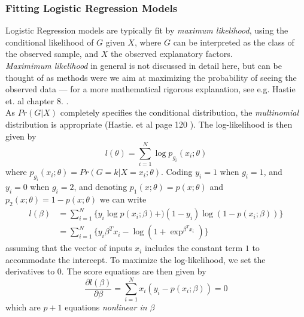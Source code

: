 \documentclass[10pt, a4paper, twocolumn]{article}
\newcommand{\myparagraph}[1]{\paragraph{#1}\mbox{}\\}
\begin{document}
		\subsubsection{Fitting Logistic Regression Models}
			Logistic Regression models are typically fit by \emph{maximum likelihood}, using the conditional likelihood of $G$ given $X$, where $G$ can be interpreted as the class of the observed sample, and $X$ the observed explanatory factors. \\
			\emph{Maximimum likelihood} in general is not discussed in detail here, but can be thought of as methods were we aim at maximizing the probability of seeing the observed data --- for a more mathematical rigorous explanation, see e.g. Hastie et. al chapter 8. \cite{ElementsOfStatLearning}.\\
			As $Pr(G|X)$ completely specifies the conditional distribution, the \emph{multinomial} distribution is appropriate (Hastie. et al page 120 \cite{ElementsOfStatLearning}). The log-likelihood is then given by
				$$l(\theta)=\sum^N_{i=1} \log{p_{g_i}}(x_i;\theta)$$
			where $p_{g_i}(x_i;\theta)=Pr(G=k|X=x_i;\theta)$. Coding $y_i=1$ when $g_i=1$, and $y_i=0$ when $g_i=2$, and denoting $p_1(x;\theta)=p(x;\theta)$ and $p_2(x;\theta)=1-p(x;\theta)$ we can write
				\begin{align*}
					l(\beta) &= \sum^N_{i=1}\{y_i\log{p(x_i;\beta)}+)(1-y_i)\log{(1-p(x_i;\beta))}\}\\
							 &= \sum^N_{i=1}\{y_i\beta^Tx_i-\log{(1+\exp^{\beta^Tx_i})}\}
				\end{align*}
			assuming that the vector of inputs $x_i$ includes the constant term $1$ to accommodate the intercept. To maximize the log-likelihood, we set the derivatives to $0$. The score equations are then given by 
				$$\frac{\partial l(\beta)}{\partial \beta} = \sum^N_{i=1}x_i(y_i-p(x_i;\beta)) = 0$$
			which are $p+1$ equations \emph{nonlinear in $\beta$}
%		
%
%		
%	
\end{document}
